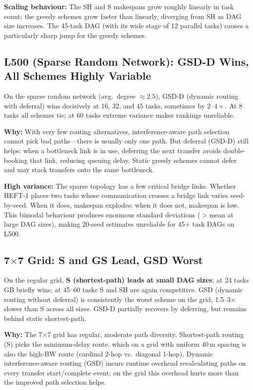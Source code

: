 \documentclass[11pt]{article}
\begin{document}
\textbf{Scaling behaviour:} The SH and S makespans grow roughly linearly in task
count; the greedy schemes grow faster than linearly, diverging from SH as DAG
size increases.  The 45-task DAG (with its wide stage of 12 parallel tasks) causes
a particularly sharp jump for the greedy schemes.

\subsection{L500 (Sparse Random Network): GSD-D Wins, All Schemes Highly Variable}

On the sparse random network (avg.\ degree $\approx2.5$), GSD-D (dynamic routing
with deferral) wins decisively at 16, 32, and 45 tasks, sometimes by $2$--$4\times$.
At 8 tasks all schemes tie; at 60 tasks extreme variance makes rankings unreliable.

\textbf{Why:} With very few routing alternatives, interference-aware path selection
cannot pick bad paths---there is usually only one path.  But deferral (GSD-D) still
helps: when a bottleneck link is in use, deferring the next transfer avoids
double-booking that link, reducing queuing delay.  Static greedy schemes cannot
defer and may stack transfers onto the same bottleneck.

\textbf{High variance:} The sparse topology has a few critical bridge links.
Whether HEFT-1 places two tasks whose communication crosses a bridge link varies
seed-by-seed.  When it does, makespan explodes; when it does not, makespan is low.
This bimodal behaviour produces enormous standard deviations ($>$mean at large
DAG sizes), making 20-seed estimates unreliable for 45+ task DAGs on L500.

\subsection{7$\times$7 Grid: S and GS Lead, GSD Worst}

On the regular grid, \textbf{S (shortest-path) leads at small DAG sizes}; at
24 tasks GB briefly wins; at 45--60 tasks S and SH are again competitive.
GSD (dynamic routing without deferral) is consistently the worst scheme on the
grid, 1.5--3$\times$ slower than S across all sizes.  GSD-D partially recovers
by deferring, but remains behind static shortest-path.

\textbf{Why:} The 7$\times$7 grid has regular, moderate path diversity.
Shortest-path routing (S) picks the minimum-delay route, which on a grid with
uniform 40\,m spacing is also the high-BW route (cardinal 2-hop vs.\ diagonal
1-hop).  Dynamic interference-aware routing (GSD) incurs runtime overhead
recalculating paths on every transfer start/complete event; on the grid this
overhead hurts more than the improved path selection helps.
\end{document}
